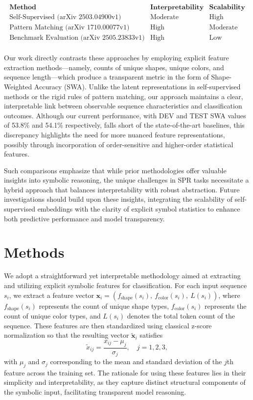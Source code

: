 \documentclass{article}
\begin{document}
\[
\begin{array}{lcc}
\textbf{Method} & \textbf{Interpretability} & \textbf{Scalability} \\
\hline
\text{Self-Supervised (arXiv 2503.04900v1)} & \text{Moderate} & \text{High} \\
\text{Pattern Matching (arXiv 1710.00077v1)} & \text{High} & \text{Moderate} \\
\text{Benchmark Evaluation (arXiv 2505.23833v1)} & \text{High} & \text{Low} \\
\end{array}
\]
 
Our work directly contrasts these approaches by employing explicit feature extraction methods—namely, counts of unique shapes, unique colors, and sequence length—which produce a transparent metric in the form of Shape-Weighted Accuracy (SWA). Unlike the latent representations in self-supervised methods or the rigid rules of pattern matching, our approach maintains a clear, interpretable link between observable sequence characteristics and classification outcomes. Although our current performance, with DEV and TEST SWA values of 53.8\% and 54.1\% respectively, falls short of the state-of-the-art baselines, this discrepancy highlights the need for more nuanced feature representations, possibly through incorporation of order-sensitive and higher-order statistical features.

Such comparisons emphasize that while prior methodologies offer valuable insights into symbolic reasoning, the unique challenges in SPR tasks necessitate a hybrid approach that balances interpretability with robust abstraction. Future investigations should build upon these insights, integrating the scalability of self-supervised embeddings with the clarity of explicit symbol statistics to enhance both predictive performance and model transparency.

\section{Methods}
We adopt a straightforward yet interpretable methodology aimed at extracting and utilizing explicit symbolic features for classification. For each input sequence \( s_i \), we extract a feature vector \( \mathbf{x}_i = \left( f_{\text{shape}}(s_i),\ f_{\text{color}}(s_i),\ L(s_i) \right) \), where \( f_{\text{shape}}(s_i) \) represents the count of unique shape types, \( f_{\text{color}}(s_i) \) represents the count of unique color types, and \( L(s_i) \) denotes the total token count of the sequence. These features are then standardized using classical z-score normalization so that the resulting vector \( \tilde{\mathbf{x}}_i \) satisfies
\[
\tilde{x}_{ij} = \frac{x_{ij} - \mu_j}{\sigma_j}, \quad j=1,2,3,
\]
with \(\mu_j\) and \(\sigma_j\) corresponding to the mean and standard deviation of the \(j\)th feature across the training set. The rationale for using these features lies in their simplicity and interpretability, as they capture distinct structural components of the symbolic input, facilitating transparent model reasoning.
\end{document}
